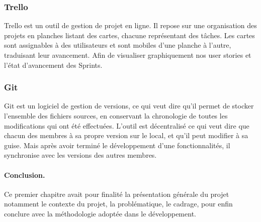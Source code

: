 \subsubsection{Trello} %
\label{ssub:Trello}

Trello est un outil de gestion de projet en ligne. Il repose sur une organisation des projets en planches listant des cartes, chacune représentant des tâches. Les cartes sont assignables à des utilisateurs et sont mobiles d'une planche à l'autre, traduisant leur avancement. Afin de visualiser graphiquement nos user stories et l’état d'avancement des Sprints.


\subsubsection{Git} %
\label{ssub:git}

Git est un logiciel de gestion de versions, ce qui veut dire qu'il permet de stocker l’ensemble des fichiers sources, en conservant la chronologie de toutes les modifications qui ont été effectuées.\newline
L'outil est décentralisé ce qui veut dire que chacun des membres à sa propre version sur le local, et qu'il peut modifier à sa guise. Mais après avoir terminé le développement d'une fonctionnalités, il synchronise avec les versions des autres membres.

\paragraph{Conclusion.} %
\label{par:conclusion}
Ce premier chapitre avait pour finalité la présentation générale du projet notamment le contexte du projet, la problématique, le cadrage, pour enfin conclure avec la méthodologie adoptée dans le développement.
